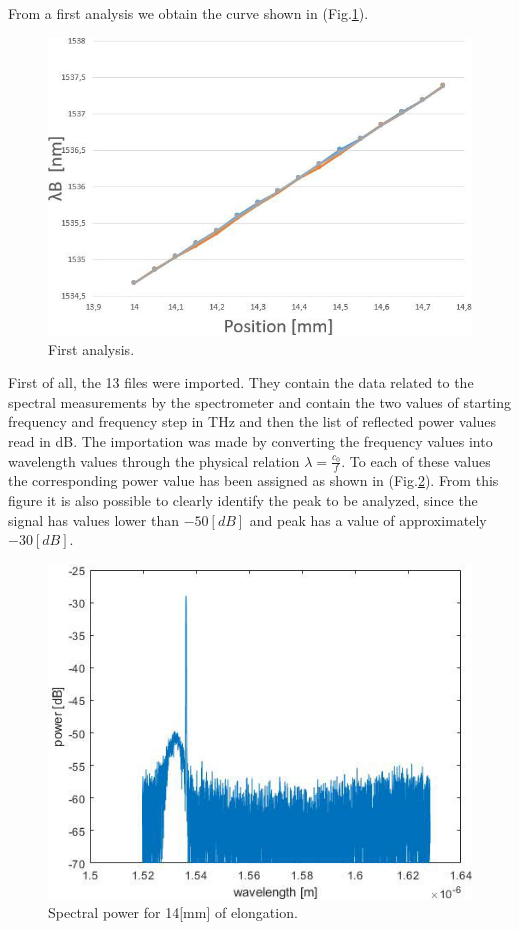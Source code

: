 From a first analysis we obtain the curve shown in (Fig.\ref{fig:firstAnalisy}).
\begin{figure}[h]
    \centering
    \includegraphics[scale=0.7]{img/firstAnalisy.jpg}
    \caption{First analysis.}
    \label{fig:firstAnalisy}
\end{figure}


\newpage
{}
First of all, the 13 files were imported. They contain the data related to the spectral measurements by the spectrometer and contain the two values of starting frequency and frequency step in THz and then the list of reflected power values read in dB. The importation was made by converting the frequency values into wavelength values through the physical relation $\lambda = \frac{c_0}{f}$. To each of these values the corresponding power value has been assigned as shown in (Fig.\ref{fig:spectralPower}). From this figure it is also possible to clearly identify the peak to be analyzed, since the signal has values lower than $-50[dB]$ and peak has a value of approximately $-30[dB]$.
\begin{figure}[h]
    \centering
    \includegraphics[scale=0.7]{img/spectralPower.jpg}
    \caption{Spectral power for 14[mm] of elongation.}
    \label{fig:spectralPower}
\end{figure}


